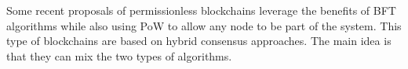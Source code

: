Some recent proposals of permissionless blockchains leverage the benefits of \gls{BFT} algorithms while also using \gls{PoW} to allow any node to be part of the system. This type of blockchains are based on hybrid consensus approaches. The main idea is that they can mix the two types of algorithms.
% 
% 
% 
% 
% 
